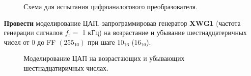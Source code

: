 \documentclass[spec, och, otchet, hidelinks]{SCWorks}
\begin{document}
\begin{figure}[h]
	\caption{Схема для испытания цифроаналогового преобразователя.}
\end{figure}

\newpage

\textbf{Провести} моделирование ЦАП, запрограммировав генератор \textbf{XWG1} (частота генерации сигналов $ f_\text{г} = $ 1 кГц) на возрастание и 
убывание шестнадцатеричных чисел от 0 до FF $(255_{10})$ при шаге $10_{16}$ ($16_{10}$).

\begin{figure}[h]
	\caption{Моделирование ЦАП на возрастающих и убывающих шестнадцатиричных числах.}
\end{figure}
\end{document}
